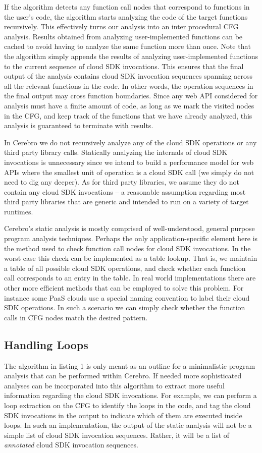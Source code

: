 If the algorithm detects any function call nodes that correspond to functions in the user's code, the algorithm
starts analyzing the code of the target functions recursively. This effectively turns our analysis into an inter procedural
CFG analysis. Results obtained from analyzing user-implemented functions can be cached to avoid
having to analyze the same function more than once. Note that the algorithm simply appends the results of
analyzing user-implemented functions to the current sequence of cloud SDK invocations. This ensures that the final output of the
analysis contains cloud SDK invocation sequences spanning across all the relevant functions in the code. 
In other words, the operation sequences in the final output may cross function boundaries.
Since any web API considered for analysis must have a finite amount of code, as long as
we mark the visited nodes in the CFG, and keep track of the functions that we have already analyzed, this
analysis is guaranteed to terminate with results.

In Cerebro we do not recursively analyze any of the cloud
SDK operations or any third party library calls. 
Statically analyzing the internals of cloud SDK invocations is
unnecessary since we intend to build a performance model for web APIs where
the smallest unit of operation is a cloud SDK call (we simply do not need to dig any deeper). As for third 
party libraries, we assume they do not contain any cloud SDK invocations -- a reasonable assumption 
regarding most third party libraries that are generic and intended to run on a variety of target runtimes. 
 
Cerebro's static analysis is mostly comprised of well-understood, general purpose program analysis techniques.
 Perhaps the only application-specific element here is the method used to check function call nodes for cloud SDK invocations.
 In the worst case this check can be implemented as a table lookup. That is, we maintain a table of all possible cloud
 SDK operations, and check whether each function call
 corresponds to an entry in the table. In real world implementations there are other more efficient methods that
 can be employed to solve this problem. For instance some PaaS clouds use a special naming convention to label
 their cloud SDK operations. 
 In such a scenario we can simply check whether the function calls in CFG nodes match the
 desired pattern. 
 
 \subsection{Handling Loops}
The algorithm in listing 1 is only meant as an outline for a minimalistic program analysis that can be performed
within Cerebro. If needed more sophisticated analyses can be incorporated into this algorithm to extract more
useful information regarding the cloud SDK invocations. For example, we can perform a loop extraction on the
CFG to identify the loops in the code, and tag the cloud SDK invocations in the output to indicate which of them
are executed inside loops. In such an implementation, the output of the static analysis will not be a simple
list of cloud SDK invocation sequences. Rather, it will be a list of \textit{annotated} cloud SDK invocation sequences.

